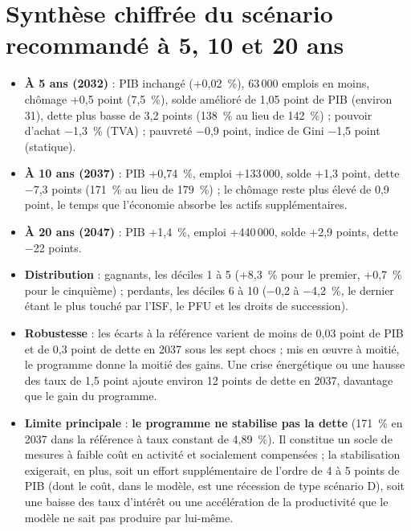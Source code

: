 \section{Synthèse chiffrée du scénario recommandé à 5, 10 et 20 ans}

\begin{table}[htbp]
\centering\scriptsize
\caption{Scénario R — programme recommandé (modèle complet).}
\label{tab:scR}
\end{table}

\begin{resultat}
\begin{itemize}
\item \textbf{À 5 ans (2032)} : PIB inchangé (+0,02~\%), 63\,000 emplois en moins, chômage +0,5 point (7,5~\%), solde
amélioré de 1,05 point de PIB (environ 31\md), dette plus basse de 3,2 points (138~\% au lieu de 142~\%) ; pouvoir
d'achat $-$1,3~\% (TVA) ; pauvreté $-$0,9 point, indice de Gini $-$1,5 point (statique).
\item \textbf{À 10 ans (2037)} : PIB +0,74~\%, emploi +133\,000, solde +1,3 point, dette $-$7,3 points (171~\% au lieu de
179~\%) ; le chômage reste plus élevé de 0,9 point, le temps que l'économie absorbe les actifs supplémentaires.
\item \textbf{À 20 ans (2047)} : PIB +1,4~\%, emploi +440\,000, solde +2,9 points, dette $-$22 points.
\item \textbf{Distribution} : gagnants, les déciles 1 à 5 (+8,3~\% pour le premier, +0,7~\% pour le cinquième) ; perdants,
les déciles 6 à 10 ($-$0,2 à $-$4,2~\%, le dernier étant le plus touché par l'ISF, le PFU et les droits de succession).
\item \textbf{Robustesse} : les écarts à la référence varient de moins de 0,03 point de PIB et de 0,3 point de dette en
2037 sous les sept chocs ; mis en œuvre à moitié, le programme donne la moitié des gains. Une crise énergétique ou une
hausse des taux de 1,5 point ajoute environ 12 points de dette en 2037, davantage que le gain du programme.
\item \textbf{Limite principale} : \textbf{le programme ne stabilise pas la dette} (171~\% en 2037 dans la référence à taux
constant de 4,89~\%). Il constitue un socle de mesures à faible coût en activité et socialement compensées ; la
stabilisation exigerait, en plus, soit un effort supplémentaire de l'ordre de 4 à 5 points de PIB (dont le coût, dans le
modèle, est une récession de type scénario D), soit une baisse des taux d'intérêt ou une accélération de la productivité
que le modèle ne sait pas produire par lui-même.
\end{itemize}
\end{resultat}

